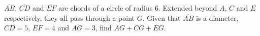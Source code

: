 $\overline{AB}$, $\overline{CD}$ and $\overline{EF}$ are chords of a circle of radius $6$. Extended beyond $A$, $C$ and $E$ respectively, they all pass through a point $G$. Given that $\overline{AB}$ is a diameter, $CD=5$, $EF=4$ and $AG=3$, find $AG+CG+EG$.
